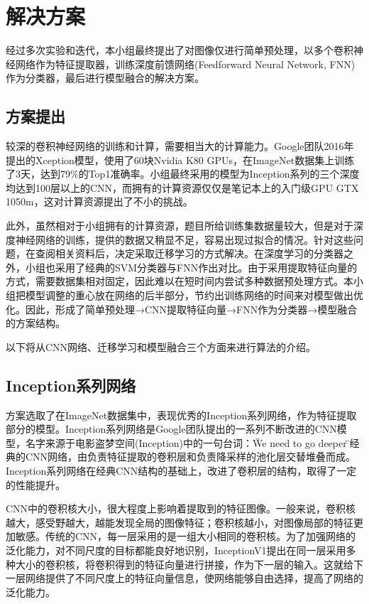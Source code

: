 \documentclass[10.5pt,twocolumn]{jbuaa}
\begin{document}
\section{解决方案}
经过多次实验和迭代，本小组最终提出了对图像仅进行简单预处理，以多个卷积神经网络作为特征提取器，训练深度前馈网络(Feedforward Neural Network, FNN)作为分类器，最后进行模型融合的解决方案。
\subsection{方案提出}
较深的卷积神经网络的训练和计算，需要相当大的计算能力。Google团队2016年提出的Xception模型，使用了60块Nvidia K80 GPUs，在ImageNet数据集上训练了3天，达到79\%的Top1准确率。小组最终采用的模型为Inception系列的三个深度均达到100层以上的CNN，而拥有的计算资源仅仅是笔记本上的入门级GPU GTX 1050m，这对计算资源提出了不小的挑战。

此外，虽然相对于小组拥有的计算资源，题目所给训练集数据量较大，但是对于深度神经网络的训练，提供的数据又稍显不足，容易出现过拟合的情况。针对这些问题，在查阅相关资料后，决定采取迁移学习的方式解决。在深度学习的分类器之外，小组也采用了经典的SVM分类器与FNN作出对比。由于采用提取特征向量的方式，需要数据集相对固定，因此难以在短时间内尝试多种数据预处理方式。本小组把模型调整的重心放在网络的后半部分，节约出训练网络的时间来对模型做出优化。因此，形成了简单预处理→CNN提取特征向量→FNN作为分类器→模型融合的方案结构。

以下将从CNN网络、迁移学习和模型融合三个方面来进行算法的介绍。

\subsection{Inception系列网络}
方案选取了在ImageNet数据集中，表现优秀的Inception系列网络，作为特征提取部分的模型。Inception系列网络是Google团队提出的一系列不断改进的CNN模型，名字来源于电影盗梦空间(Inception)中的一句台词：\"We need to go deeper\"。经典的CNN网络，由负责特征提取的卷积层和负责降采样的池化层交替堆叠而成。Inception系列网络在经典CNN结构的基础上，改进了卷积层的结构，取得了一定的性能提升。

CNN中的卷积核大小，很大程度上影响着提取到的特征图像。一般来说，卷积核越大，感受野越大，越能发现全局的图像特征；卷积核越小，对图像局部的特征更加敏感。传统的CNN，每一层采用的是一组大小相同的卷积核。为了加强网络的泛化能力，对不同尺度的目标都能良好地识别，InceptionV1提出在同一层采用多种大小的卷积核，将卷积得到的特征向量进行拼接，作为下一层的输入。这就给下一层网络提供了不同尺度上的特征向量信息，使网络能够自由选择，提高了网络的泛化能力。
\end{document}

